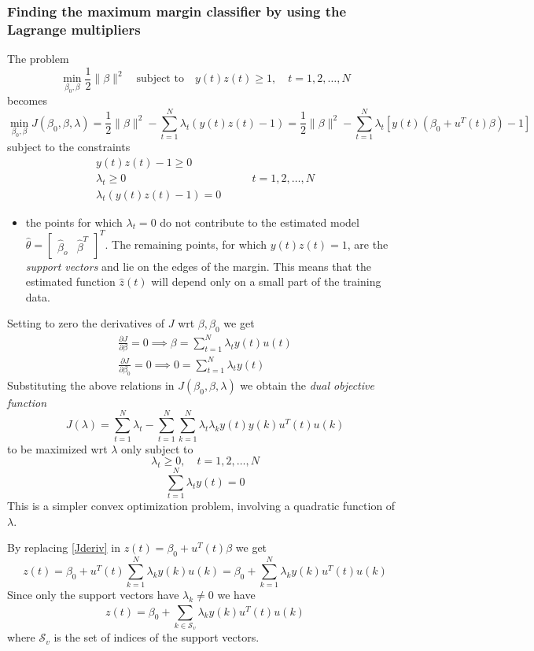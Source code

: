 \documentclass{book}
\theoremstyle{definition}
\theoremstyle{remark}
\theoremstyle{remark}
\begin{document}
\subsubsection{Finding the maximum margin classifier by using the Lagrange multipliers}
The problem 
\[
    \min_{\beta_0,\beta}\displaystyle\frac{1}{2}\|\beta\|^2 \quad \text{subject to} \quad y(t)z(t) \geq 1, \quad t=1,2,\dots,N
\]
becomes
\[
    \min_{\beta_0,\beta}J(\beta_0,\beta,\lambda)= \displaystyle\frac{1}{2}\|\beta\|^2-\displaystyle\sum_{t=1}^{N}\lambda_t(y(t)z(t)-1)=\displaystyle\frac{1}{2}\|\beta\|^2-\displaystyle\sum_{t=1}^{N}\lambda_t[y(t)(\beta_0+u^T(t)\beta)-1]
\]
subject to the constraints 
\begin{align*}
    y(t)z(t)-1 \geq 0 &\\
    \lambda_t \geq 0 &\qquad t=1,2,\dots,N\\
    \lambda_t(y(t)z(t)-1)=0 &
\end{align*}
\begin{itemize}
    \item the points for which $\lambda_t=0$ do not contribute to the estimated model $\hat{\theta}=\begin{bmatrix}
            \hat{\beta}_o & \hat{\beta}^T
        \end{bmatrix}^T$. The remaining points, for which $y(t)z(t)=1$, are the \emph{support vectors} and lie on the edges of the margin. This means that the estimated function $\hat{z}(t)$ will depend only on a small part of the training data.
\end{itemize}
Setting to zero the derivatives of $J$ wrt $\beta,\beta_0$ we get 
\begin{gather} \label{Jderiv}
    \displaystyle\frac{\partial J}{\partial \beta}=0 \implies \beta=\displaystyle\sum_{t=1}^{N}\lambda_ty(t)u(t)\\
    \displaystyle\frac{\partial J}{\partial \beta_0}=0 \implies 0=\displaystyle\sum_{t=1}^{N}\lambda_ty(t)
\end{gather}
Substituting the above relations in $J(\beta_0,\beta,\lambda)$ we obtain the \emph{dual objective function}
\[
    J(\lambda)=\displaystyle\sum_{t=1}^{N}\lambda_t-\displaystyle\sum_{t=1}^{N}\displaystyle\sum_{k=1}^{N}\lambda_t\lambda_ky(t)y(k)u^T(t)u(k)
\]
to be maximized wrt $\lambda$ only subject to 
\[
    \lambda_t \geq 0, \quad t=1,2,\dots,N
\]
\[
    \displaystyle\sum_{t=1}^{N}\lambda_ty(t)=0
\]
This is a simpler convex optimization problem, involving a quadratic function of $\lambda$.

By replacing \ref{Jderiv} in $z(t)=\beta_0+u^T(t)\beta$ we get 
\[
    z(t)=\beta_0 + u^T(t)\displaystyle\sum_{k=1}^{N}\lambda_ky(k)u(k)=\beta_0+\displaystyle\sum_{k=1}^{N}\lambda_ky(k)u^T(t)u(k)
\]
Since only the support vectors have $\lambda_k\neq 0$ we have
\[
    z(t)=\beta_0+\displaystyle\sum_{k\in\mathcal{S}_v}^{}\lambda_ky(k)u^T(t)u(k)
\]
where $\mathcal{S}_v$ is the set of indices of the support vectors. 
\end{document}

